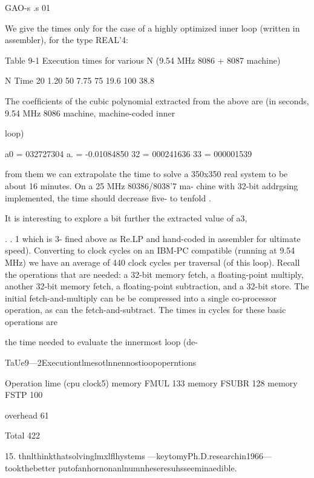{{{{{{{{GAO-s
.s
01

We give the times only for the case of a highly optimized inner
loop (written in assembler), for the type REAL'4:

 

Table 9-1 Execution times for various N (9.54 MHz 8086 + 8087 machine)

 

N Time
20 1.20
50 7.75
75 19.6
100 38.8

 

 

 

The coefﬁcients of the cubic polynomial extracted from the above
are (in seconds, 9.54 MHz 8086 machine, machine-coded inner

loop)

a0 = 032727304
a. = -0.01084850
32 = 000241636
33 = 000001539

from them we can extrapolate the time to solve a 350x350 real
system to be about 16 minutes. On a 25 MHz 80386/8038'7 ma-
chine with 32-bit addrgsing implemented, the time should
decrease ﬁve- to tenfold .

It is interesting to explore a bit further the extracted value of a3,

. . 1
which is 3-
ﬁned above as Re.LP and hand-coded in assembler for ultimate
speed). Converting to clock cycles on an IBM-PC compatible
(running at 9.54 MHz) we have an average of 440 clock cycles per
traversal (of this loop). Recall the operations that are needed: a
32-bit memory fetch, a floating-point multiply, another 32-bit
memory fetch, a floating-point subtraction, and a 32-bit store.
The initial fetch-and-multiply can be be compressed into a single
co-processor operation, as can the fetch-and-subtract. The times
in cycles for these basic operations are

the time needed to evaluate the innermost loop (de-

TaUe9—2Executiontlmesotlnnennostioopoperntions

 

Operation lime (cpu clock5)
memory FMUL 133
memory FSUBR 128
memory FSTP 100

overhead 61

 

Total 422

 

 

 

 

15. thnlthinkthatsolvinglmxlflhystems —keytomyPh.D.researchin1966— tookthebetter
putofanhornonanlnumnheseresuhsseeminaedible.

}}}}}}}}
